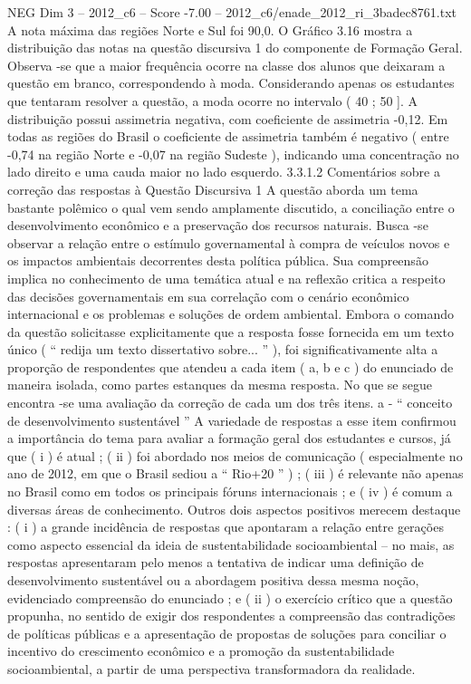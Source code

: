 \begin{textsample}{NEG Dim 3 – 2012\_c6 – Score -7.00 – 2012\_c6/enade\_2012\_ri\_3badec8761.txt}
A nota máxima das regiões Norte e Sul foi 90,0.
O Gráfico 3.16 mostra a distribuição das notas na questão discursiva 1 do componente de Formação Geral.
Observa -se que a maior frequência ocorre na classe dos alunos que deixaram a questão em branco, correspondendo à moda.
Considerando apenas os estudantes que tentaram resolver a questão, a moda ocorre no intervalo ( 40 ; 50 ].
A distribuição possui assimetria negativa, com coeficiente de assimetria -0,12.
Em todas as regiões do Brasil o coeficiente de assimetria também é negativo ( entre -0,74 na região Norte e -0,07 na região Sudeste ), indicando uma concentração no lado direito e uma cauda maior no lado esquerdo. 3.3.1.2 Comentários sobre a correção das respostas à Questão Discursiva 1 A questão aborda um tema bastante polêmico o qual vem sendo amplamente discutido, a conciliação entre o desenvolvimento econômico e a preservação dos recursos naturais.
Busca -se observar a relação entre o estímulo governamental à compra de veículos novos e os impactos ambientais decorrentes desta política pública.
Sua compreensão implica no conhecimento de uma temática atual e na reflexão critica a respeito das decisões governamentais em sua correlação com o cenário econômico internacional e os problemas e soluções de ordem ambiental.
Embora o comando da questão solicitasse explicitamente que a resposta fosse fornecida em um texto único ( “ redija um texto dissertativo sobre... ” ), foi significativamente alta a proporção de respondentes que atendeu a cada item ( a, b e c ) do enunciado de maneira isolada, como partes estanques da mesma resposta.
No que se segue encontra -se uma avaliação da correção de cada um dos três itens. a - “ conceito de desenvolvimento sustentável ” A variedade de respostas a esse item confirmou a importância do tema para avaliar a formação geral dos estudantes e cursos, já que ( i ) é atual ; ( ii ) foi abordado nos meios de comunicação ( especialmente no ano de 2012, em que o Brasil sediou a “ Rio+20 ” ) ; ( iii ) é relevante não apenas no Brasil como em todos os principais fóruns internacionais ; e ( iv ) é comum a diversas áreas de conhecimento.
Outros dois aspectos positivos merecem destaque : ( i ) a grande incidência de respostas que apontaram a relação entre gerações como aspecto essencial da ideia de sustentabilidade socioambiental – no mais, as respostas apresentaram pelo menos a tentativa de indicar uma definição de desenvolvimento sustentável ou a abordagem positiva dessa mesma noção, evidenciado compreensão do enunciado ; e ( ii ) o exercício crítico que a questão propunha, no sentido de exigir dos respondentes a compreensão das contradições de políticas públicas e a apresentação de propostas de soluções para conciliar o incentivo do crescimento econômico e a promoção da sustentabilidade socioambiental, a partir de uma perspectiva transformadora da realidade.

\end{textsample}
